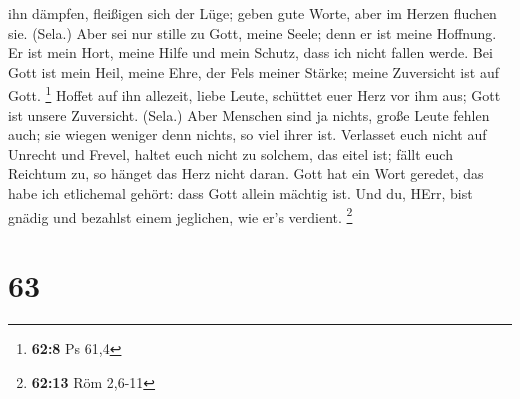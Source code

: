 ihn dämpfen, fleißigen sich der Lüge; geben gute Worte, aber im Herzen
fluchen sie. (Sela.)  Aber sei nur stille zu Gott, meine
Seele; denn er ist meine Hoffnung.  Er ist mein Hort, meine
Hilfe und mein Schutz, dass ich nicht fallen werde.  Bei
Gott ist mein Heil, meine Ehre, der Fels meiner Stärke; meine Zuversicht
ist auf Gott. \footnote{\textbf{62:8} Ps 61,4}  Hoffet auf
ihn allezeit, liebe Leute, schüttet euer Herz vor ihm aus; Gott ist
unsere Zuversicht. (Sela.)  Aber Menschen sind ja nichts,
große Leute fehlen auch; sie wiegen weniger denn nichts, so viel ihrer
ist.  Verlasset euch nicht auf Unrecht und Frevel, haltet
euch nicht zu solchem, das eitel ist; fällt euch Reichtum zu, so hänget
das Herz nicht daran.  Gott hat ein Wort geredet, das habe
ich etlichemal gehört: dass Gott allein mächtig ist.  Und
du, HErr, bist gnädig und bezahlst einem jeglichen, wie er's verdient.
\footnote{\textbf{62:13} Röm 2,6-11}

\hypertarget{section-24}{%
\section{63}\label{section-24}}

